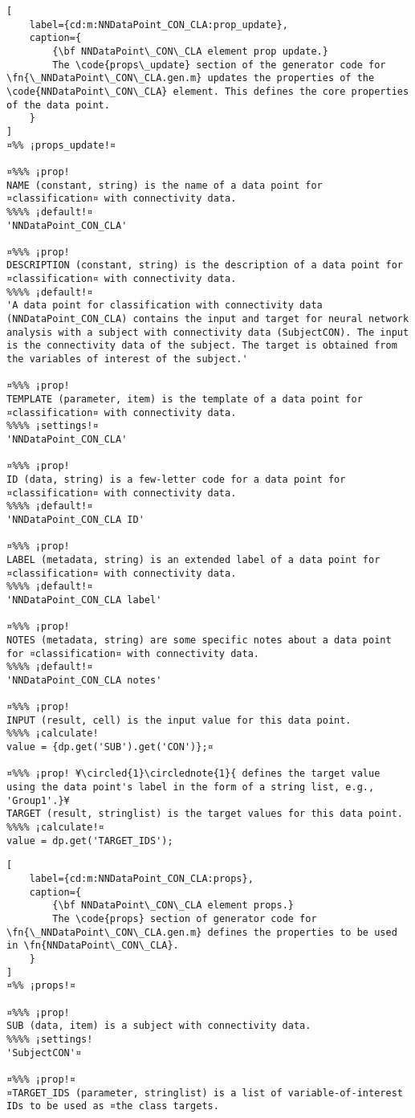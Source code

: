\documentclass{tufte-handout}
\begin{document}
\begin{lstlisting}[
	label={cd:m:NNDataPoint_CON_CLA:prop_update},
	caption={
		{\bf NNDataPoint\_CON\_CLA element prop update.}
		The \code{props\_update} section of the generator code for \fn{\_NNDataPoint\_CON\_CLA.gen.m} updates the properties of the \code{NNDataPoint\_CON\_CLA} element. This defines the core properties of the data point.
	}
]
¤%% ¡props_update!¤

¤%%% ¡prop!
NAME (constant, string) is the name of a data point for ¤classification¤ with connectivity data.
%%%% ¡default!¤
'NNDataPoint_CON_CLA'

¤%%% ¡prop!
DESCRIPTION (constant, string) is the description of a data point for ¤classification¤ with connectivity data.
%%%% ¡default!¤
'A data point for classification with connectivity data (NNDataPoint_CON_CLA) contains the input and target for neural network analysis with a subject with connectivity data (SubjectCON). The input is the connectivity data of the subject. The target is obtained from the variables of interest of the subject.'

¤%%% ¡prop!
TEMPLATE (parameter, item) is the template of a data point for ¤classification¤ with connectivity data.
%%%% ¡settings!¤
'NNDataPoint_CON_CLA'

¤%%% ¡prop!
ID (data, string) is a few-letter code for a data point for ¤classification¤ with connectivity data.
%%%% ¡default!¤
'NNDataPoint_CON_CLA ID'

¤%%% ¡prop!
LABEL (metadata, string) is an extended label of a data point for ¤classification¤ with connectivity data.
%%%% ¡default!¤
'NNDataPoint_CON_CLA label'

¤%%% ¡prop!
NOTES (metadata, string) are some specific notes about a data point for ¤classification¤ with connectivity data.
%%%% ¡default!¤
'NNDataPoint_CON_CLA notes'

¤%%% ¡prop!
INPUT (result, cell) is the input value for this data point.
%%%% ¡calculate!
value = {dp.get('SUB').get('CON')};¤
    
¤%%% ¡prop! ¥\circled{1}\circlednote{1}{ defines the target value using the data point's label in the form of a string list, e.g., 'Group1'.}¥
TARGET (result, stringlist) is the target values for this data point.
%%%% ¡calculate!¤
value = dp.get('TARGET_IDS'); 

\end{lstlisting}

\begin{lstlisting}[
	label={cd:m:NNDataPoint_CON_CLA:props},
	caption={
		{\bf NNDataPoint\_CON\_CLA element props.}
		The \code{props} section of generator code for \fn{\_NNDataPoint\_CON\_CLA.gen.m} defines the properties to be used in \fn{NNDataPoint\_CON\_CLA}.
	}
]
¤%% ¡props!¤

¤%%% ¡prop!
SUB (data, item) is a subject with connectivity data.
%%%% ¡settings!
'SubjectCON'¤

¤%%% ¡prop!¤ 
¤TARGET_IDS (parameter, stringlist) is a list of variable-of-interest IDs to be used as ¤the class targets.

\end{lstlisting}
\end{document}
